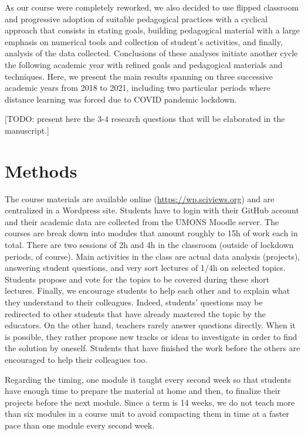\documentclass[
]{article}
\begin{document}
As our course were completely reworked, we also decided to use flipped
classroom and progressive adoption of suitable pedagogical practices
with a cyclical approach that consists in stating goals, building
pedagogical material with a large emphasis on numerical tools and
collection of student's activities, and finally, analysis of the data
collected. Conclusions of these analyses initiate another cycle the
following academic year with refined goals and pedagogical materials and
techniques. Here, we present the main results spanning on three
successive academic years from 2018 to 2021, including two particular
periods where distance learning was forced due to COVID pandemic
lockdown.

{[}TODO: present here the 3-4 research questions that will be elaborated
in the manuscript.{]}

\hypertarget{methods}{%
\section{Methods}\label{methods}}

The course materials are available online
(\url{https://wp.sciviews.org}) and are centralized in a Wordpress site.
Students have to login with their GitHub account and their academic data
are collected from the UMONS Moodle server. The courses are break down
into modules that amount roughly to 15h of work each in total. There are
two sessions of 2h and 4h in the classroom (outside of lockdown periods,
of course). Main activities in the class are actual data analysis
(projects), answering student questions, and very sort lectures of 1/4h
on selected topics. Students propose and vote for the topics to be
covered during these short lectures. Finally, we encourage students to
help each other and to explain what they understand to their colleagues.
Indeed, students' questions may be redirected to other students that
have already mastered the topic by the educators. On the other hand,
teachers rarely answer questions directly. When it is possible, they
rather propose new tracks or ideas to investigate in order to find the
solution by oneself. Students that have finished the work before the
others are encouraged to help their colleagues too.

Regarding the timing, one module it taught every second week so that
students have enough time to prepare the material at home and then, to
finalize their projects before the next module. Since a term is 14
weeks, we do not teach more than six modules in a course unit to avoid
compacting them in time at a faster pace than one module every second
week.
\end{document}
